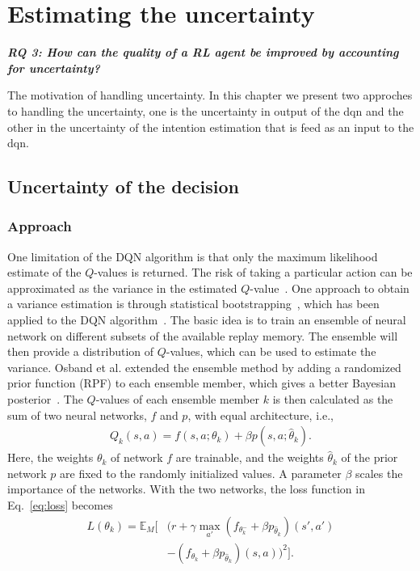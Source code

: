 \chapter{Estimating the uncertainty}
\begin{center}
	\textit{\textbf{RQ 3: How can the quality of a RL agent be improved by accounting for uncertainty?}}
	\end{center}
	\vspace{12pt}

The motivation of handling uncertainty. In this chapter we present two approches to handling the uncertainty, one is the uncertainty in output of the \gls{dqn} and the other in the uncertainty of the intention estimation that is feed as an input to the \gls{dqn}.


\section{Uncertainty of the decision}


\subsection{Approach}
One limitation of the DQN algorithm is that only the maximum likelihood estimate of the $Q$-values is returned. The risk of taking a particular action can be approximated as the variance in the estimated $Q$-value~\cite{Garcia2015}. One approach to obtain a variance estimation is through statistical bootstrapping~\cite{Efron1982}, which has been applied to the DQN algorithm~\cite{Osband2016}. The basic idea is to train an ensemble of neural network on different subsets of the available replay memory. The ensemble will then provide a distribution of $Q$-values, which can be used to estimate the variance. Osband et al. extended the ensemble method by adding a randomized prior function (RPF) to each ensemble member, which gives a better Bayesian posterior~\cite{Osband2018}. The $Q$-values of each ensemble member $k$ is then calculated as the sum of two neural networks, $f$ and $p$, with equal architecture, i.e.,
%
\begin{align}
	Q_k(s,a) = f(s,a;\theta_k) + \beta p(s,a;\hat{\theta}_k).
\end{align}
%
Here, the weights $\theta_k$ of network $f$ are trainable, and the weights $\hat{\theta}_k$ of the prior network $p$ are fixed to the randomly initialized values. A parameter $\beta$ scales the importance of the networks. With the two networks, the loss function in Eq.~\ref{eq:loss} becomes
%
\begin{align}
	\label{eq:loss_boot}
	L(\theta_k) = \mathbb{E}_M \Big[ & (r + \gamma \max_{a'} (f_{\theta^-_k}+\beta p_{\hat{\theta}_k})(s',a') \nonumber \\
	& - (f_{\theta_k}+ \beta p_{\hat{\theta}_k})(s,a) )^2 \Big].
\end{align} 

